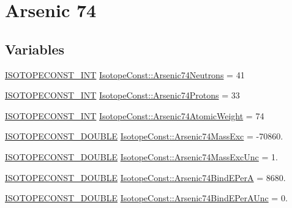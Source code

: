 \hypertarget{group___isotope_const-_arsenic-_as74}{}\section{Arsenic 74}
\label{group___isotope_const-_arsenic-_as74}
\subsection*{Variables}
\begin{DoxyCompactItemize}
\item 
\mbox{\hyperlink{group___isotope_const-_macros_ga5f18360b3e99483a35c32d789e62621c}{I\+S\+O\+T\+O\+P\+E\+C\+O\+N\+S\+T\+\_\+\+I\+NT}} \mbox{\hyperlink{group___isotope_const-_arsenic-_as74_gad68ef32e9d129dcb1756de0261d81947}{Isotope\+Const\+::\+Arsenic74\+Neutrons}} = 41
\item 
\mbox{\hyperlink{group___isotope_const-_macros_ga5f18360b3e99483a35c32d789e62621c}{I\+S\+O\+T\+O\+P\+E\+C\+O\+N\+S\+T\+\_\+\+I\+NT}} \mbox{\hyperlink{group___isotope_const-_arsenic-_as74_ga3582bcdbb4372a7b6c67b20985cb52e9}{Isotope\+Const\+::\+Arsenic74\+Protons}} = 33
\item 
\mbox{\hyperlink{group___isotope_const-_macros_ga5f18360b3e99483a35c32d789e62621c}{I\+S\+O\+T\+O\+P\+E\+C\+O\+N\+S\+T\+\_\+\+I\+NT}} \mbox{\hyperlink{group___isotope_const-_arsenic-_as74_gab3b5a4eeaf01709e0c89645362a373be}{Isotope\+Const\+::\+Arsenic74\+Atomic\+Weight}} = 74
\item 
\mbox{\hyperlink{group___isotope_const-_macros_ga8f45a7272ce02c0b4c65c44636ed719a}{I\+S\+O\+T\+O\+P\+E\+C\+O\+N\+S\+T\+\_\+\+D\+O\+U\+B\+LE}} \mbox{\hyperlink{group___isotope_const-_arsenic-_as74_ga70828ec09ca27d695d7b2a006304c92f}{Isotope\+Const\+::\+Arsenic74\+Mass\+Exc}} = -\/70860.
\item 
\mbox{\hyperlink{group___isotope_const-_macros_ga8f45a7272ce02c0b4c65c44636ed719a}{I\+S\+O\+T\+O\+P\+E\+C\+O\+N\+S\+T\+\_\+\+D\+O\+U\+B\+LE}} \mbox{\hyperlink{group___isotope_const-_arsenic-_as74_gaab7721850dfff9b148376f6ea194a00c}{Isotope\+Const\+::\+Arsenic74\+Mass\+Exc\+Unc}} = 1.
\item 
\mbox{\hyperlink{group___isotope_const-_macros_ga8f45a7272ce02c0b4c65c44636ed719a}{I\+S\+O\+T\+O\+P\+E\+C\+O\+N\+S\+T\+\_\+\+D\+O\+U\+B\+LE}} \mbox{\hyperlink{group___isotope_const-_arsenic-_as74_ga9d225e8cc3ba7cec9df7b21e917ccf78}{Isotope\+Const\+::\+Arsenic74\+Bind\+E\+PerA}} = 8680.
\item 
\mbox{\hyperlink{group___isotope_const-_macros_ga8f45a7272ce02c0b4c65c44636ed719a}{I\+S\+O\+T\+O\+P\+E\+C\+O\+N\+S\+T\+\_\+\+D\+O\+U\+B\+LE}} \mbox{\hyperlink{group___isotope_const-_arsenic-_as74_ga3a281f3205692f40d6c7d56023d85637}{Isotope\+Const\+::\+Arsenic74\+Bind\+E\+Per\+A\+Unc}} = 0.

\end{DoxyCompactItemize}
